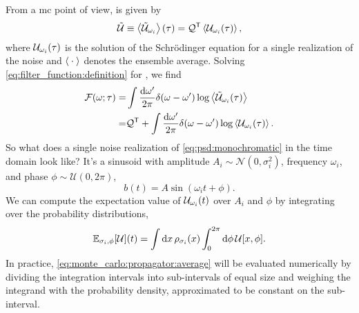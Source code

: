 From a \gls{mc} point of view, \liouvUe is given by
\begin{align}
    \liouvUe \equiv \expval{\liouvUe_{\omega_i}}(\tau) = \liouvQ\transpose \expval{\liouvU_{\omega_i}(\tau)},
\end{align}
where $\mathcal{U}_{\omega_i}(\tau)$ is the solution of the Schrödinger equation for a single realization of the noise and $\expval{\:\cdot\:}$ denotes the ensemble average.
Solving \cref{eq:filter_function:definition} for \FF, we find
\begin{equation}
    \begin{split}
        \FF =& \int\frac{\dd{\omega'}}{2\pi} \delta(\omega-\omega') \log\expval{\liouvUe_{\omega_i}(\tau)} \\
            =& \liouvQ\transpose + \int\frac{\dd{\omega'}}{2\pi} \delta(\omega-\omega') \log\expval{\liouvU_{\omega_i}(\tau)}.
    \end{split}
\end{equation}
So what does a single noise realization of \cref{eq:psd:monochromatic} in the time domain look like?
It's a sinusoid with amplitude $A_i \sim \mathcal{N}(0, \sigma_i^2)$, frequency $\omega_i$, and phase $\phi \sim \mathcal{U}(0, 2\pi)$,
\begin{equation}
    b(t) = A\sin(\omega_i t + \phi).
\end{equation}
We can compute the expectation value of $\mathcal{U}_{\omega_i}(t)$ over $A_i$ and $\phi$ by integrating over the probability distributions,
\begin{equation}
    \label{eq:monte_carlo:propagator:average}
    \mathbb{E}_{\sigma_i,\phi}[\mathcal{U}](t) = \int\dd{x}\rho_{\sigma_i}(x)\int_0^{2\pi}\dd{\phi}\mathcal{U}[x, \phi].
\end{equation}
In practice, \cref{eq:monte_carlo:propagator:average} will be evaluated numerically by dividing the integration intervals into sub-intervals of equal size and weighing the integrand with the probability density, approximated to be constant on the sub-interval.
